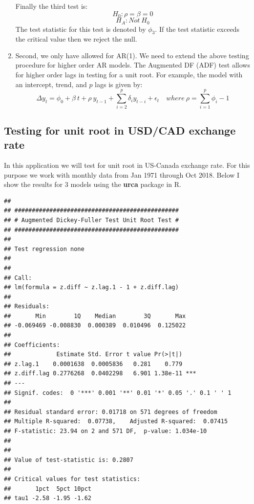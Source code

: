 \documentclass[]{book}
\theoremstyle{definition}
\theoremstyle{definition}
\theoremstyle{definition}
\theoremstyle{remark}
\begin{document}
\begin{enumerate}
  Finally the third test is: \[H_0: \rho=\beta=0 \] \[H_A: Not \ H_0\]
  The test statistic for this test is denoted by \(\phi_3\). If the test
  statistic exceeds the critical value then we reject the null.
\item
  Second, we only have allowed for AR(1). We need to extend the above
  testing procedure for higher order AR models. The Augmented DF (ADF)
  test allows for higher order lags in testing for a unit root. For
  example, the model with an intercept, trend, and \(p\) lags is given
  by:
  \[\Delta y_t= \phi_0 + \beta \ t+ \rho \ y_{t-1}+\sum_{i=2}^p\delta_i  y_{t-i}+\epsilon_t  \quad where \ \rho=\sum_{i=1}^p \phi_i-1\]
\end{enumerate}

\hypertarget{testing-for-unit-root-in-usdcad-exchange-rate}{%
\subsection{Testing for unit root in USD/CAD exchange
rate}\label{testing-for-unit-root-in-usdcad-exchange-rate}}

In this application we will test for unit root in US-Canada exchange
rate. For this purpose we work with monthly data from Jan 1971 through
Oct 2018. Below I show the results for 3 models using the \textbf{urca}
package in R.

\begin{verbatim}
## 
## ############################################### 
## # Augmented Dickey-Fuller Test Unit Root Test # 
## ############################################### 
## 
## Test regression none 
## 
## 
## Call:
## lm(formula = z.diff ~ z.lag.1 - 1 + z.diff.lag)
## 
## Residuals:
##       Min        1Q    Median        3Q       Max 
## -0.069469 -0.008830  0.000389  0.010496  0.125022 
## 
## Coefficients:
##             Estimate Std. Error t value Pr(>|t|)    
## z.lag.1    0.0001638  0.0005836   0.281    0.779    
## z.diff.lag 0.2776268  0.0402298   6.901 1.38e-11 ***
## ---
## Signif. codes:  0 '***' 0.001 '**' 0.01 '*' 0.05 '.' 0.1 ' ' 1
## 
## Residual standard error: 0.01718 on 571 degrees of freedom
## Multiple R-squared:  0.07738,    Adjusted R-squared:  0.07415 
## F-statistic: 23.94 on 2 and 571 DF,  p-value: 1.034e-10
## 
## 
## Value of test-statistic is: 0.2807 
## 
## Critical values for test statistics: 
##       1pct  5pct 10pct
## tau1 -2.58 -1.95 -1.62
\end{verbatim}
\end{document}
